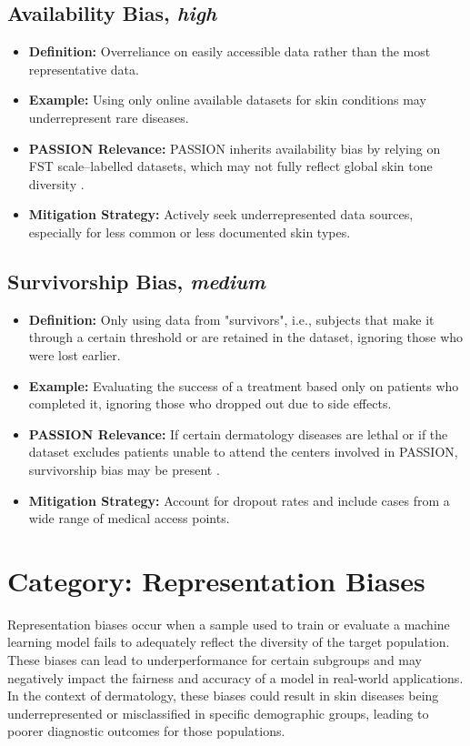 \begin{refsection}
		\subsection{Availability Bias, \textit{high}}
		\begin{itemize}
			\item \textbf{Definition:} Overreliance on easily accessible data rather than the most representative data.
			\item \textbf{Example:} Using only online available datasets for skin conditions may underrepresent rare diseases.
			\item \textbf{PASSION Relevance:} PASSION inherits availability bias by relying on FST scale–labelled datasets, which may not fully reflect global skin tone diversity \autocites{Chakraborty_2024, c9, c10}.
			\item \textbf{Mitigation Strategy:} Actively seek underrepresented data sources, especially for less common or less documented skin types.
		\end{itemize}
		
		\subsection{Survivorship Bias, \textit{medium}}
		\begin{itemize}
			\item \textbf{Definition:} Only using data from "survivors", i.e., subjects that make it through a certain threshold or are retained in the dataset, ignoring those who were lost earlier.
			\item \textbf{Example:} Evaluating the success of a treatment based only on patients who completed it, ignoring those who dropped out due to side effects.
			\item \textbf{PASSION Relevance:} If certain dermatology diseases are lethal or if the dataset excludes patients unable to attend the centers involved in PASSION, survivorship bias may be present \autocite{Mester_2022}.
			\item \textbf{Mitigation Strategy:} Account for dropout rates and include cases from a wide range of medical access points.
		\end{itemize}
		
		
		\section{\textbf{Category:} Representation Biases}
		Representation biases occur when a sample used to train or evaluate a machine learning model fails to adequately reflect the diversity of the target population. These biases can lead to underperformance for certain subgroups and may negatively impact the fairness and accuracy of a model in real-world applications. In the context of dermatology, these biases could result in skin diseases being underrepresented or misclassified in specific demographic groups, leading to poorer diagnostic outcomes for those populations.
		

\end{refsection}
